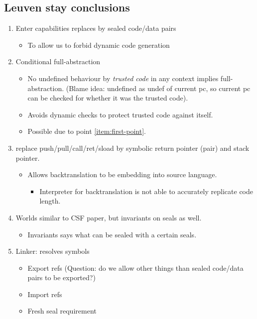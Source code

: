 \documentclass[a4paper]{article}
\begin{document}
\subsection{Leuven stay conclusions}
\begin{enumerate}
\item Enter capabilities replaces by sealed code/data pairs \label{item:first-point}
  \begin{itemize}
  \item To allow us to forbid dynamic code generation
  \end{itemize}
\item Conditional full-abstraction
  \begin{itemize}
  \item No undefined behaviour by \emph{trusted code} in any context implies full-abstraction. (Blame idea: undefined as undef of current pc, so current pc can be checked for whether it was the trusted code).
  \item Avoids dynamic checks to protect trusted code against itself.
  \item Possible due to point \ref{item:first-point}.
  \end{itemize}
\item replace push/pull/call/ret/sload by symbolic return pointer (pair) and stack pointer.
  \begin{itemize}
  \item Allows backtranslation to be embedding into source language.
    \begin{itemize}
    \item Interpreter for backtranslation is not able to accurately replicate code length.
    \end{itemize}
  \end{itemize}
\item Worlds similar to CSF paper, but invariants on seals as well.
  \begin{itemize}
  \item Invariants says what can be sealed with a certain seals.
  \end{itemize}
\item Linker: resolves symbols
  \begin{itemize}
  \item Export refs (Question: do we allow other things than sealed code/data pairs to be exported?)
  \item Import refs
  \item Fresh seal requirement
  \end{itemize}

\end{enumerate}
\end{document}
